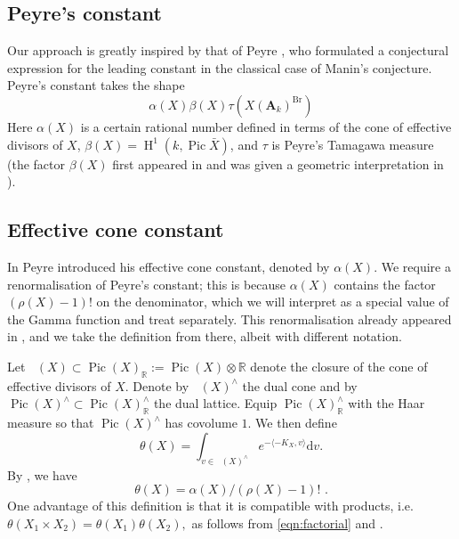 \documentclass[a4paper,12pt,reqno]{amsart}
\numberwithin{equation}{section} \numberwithin{figure}{section}
\DeclareMathOperator{\Pic}{Pic} \DeclareMathOperator{\Div}{Div}
\DeclareMathOperator{\Br}{Br} \DeclareMathOperator{\Brnr}{Br_{nr}}
\DeclareMathOperator{\HH}{H}
\DeclareMathOperator{\Eff}{\Lambda_{eff} }
\newcommand\R{\mathbb{R}}
\newcommand{\Adele}{\mathbf{A}}
\renewcommand{\#}{\sharp}
\theoremstyle{definition}
\numberwithin{lemma}{section}
\begin{document}
\subsection{Peyre's constant}
Our approach is greatly inspired by that of Peyre \cite{Pey95}, who formulated a conjectural expression for the leading constant
in the classical case of Manin's conjecture. Peyre's constant takes the shape
\begin{equation} \label{eqn:Peyre}
	\alpha(X)\beta(X)\tau(X(\Adele_k)^{\Br})
\end{equation}
Here $\alpha(X)$ is a certain rational number defined in terms of the cone
of effective divisors of $X$, $\beta(X) = \HH^1(k, \Pic \bar{X})$, and $\tau$ is Peyre's Tamagawa measure (the factor $\beta(X)$ first appeared in \cite{BT95} and was given a geometric interpretation in \cite{Sal98}).

\subsection{Effective cone constant}

In \cite[Def.~2.4]{Pey95} Peyre introduced his effective cone constant, denoted by $\alpha(X)$. We require a renormalisation of Peyre's constant; this is because $\alpha(X)$ contains the factor $(\rho(X) - 1)!$ on the denominator, which we will interpret as a special value of the Gamma function and treat separately. This renormalisation already appeared in \cite{BT95}, and we take the definition from there, albeit with different notation.

Let $\Eff(X) \subset \Pic(X)_\R := \Pic(X) \otimes \R$ denote the closure of the cone of effective divisors of $X$. Denote by $\Eff(X)^\wedge$ the dual cone and by $\Pic(X)^\wedge \subset \Pic(X)_\R^\wedge$ the dual lattice. Equip $\Pic(X)_\R^\wedge$ with the Haar measure so that $\Pic(X)^\wedge$ has covolume $1$. We then define
\[
	\theta(X) = \int_{ v \in \Eff(X)^\wedge} e^{-\langle -K_X, v\rangle} \mathrm{d}v.
\]
By \cite[Rem.~2.4.8]{BT95}, we have
\begin{equation} \label{eqn:factorial}
	\theta(X) = \alpha(X)  / (\rho(X) - 1)! \,\, .
\end{equation}
One advantage of this definition is that it is compatible with products, i.e.~$\theta(X_1 \times X_2) = \theta(X_1) \theta(X_2),$
as follows from \eqref{eqn:factorial} and \cite[Lem.~4.2]{Pey95}.
\end{document}
